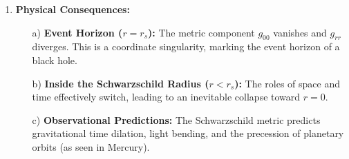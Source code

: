 {\begin{enumerate}
    \item \textbf{Physical Consequences:}  
    \begin{itemize}
        \item[a)] \textbf{Event Horizon (\(r = r_s\)):} The metric component \( g_{00} \) vanishes and \( g_{rr} \) diverges. This is a coordinate singularity, marking the event horizon of a black hole.
        \item[b)] \textbf{Inside the Schwarzschild Radius (\(r < r_s\)):} The roles of space and time effectively switch, leading to an inevitable collapse toward \( r = 0 \).
        \item[c)] \textbf{Observational Predictions:} The Schwarzschild metric predicts gravitational time dilation, light bending, and the precession of planetary orbits (as seen in Mercury).
    \end{itemize}
\end{enumerate}

}